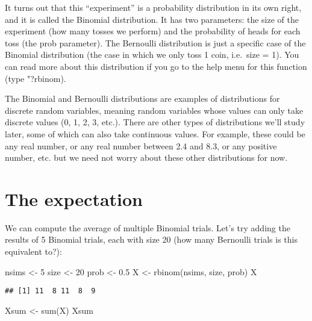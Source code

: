\documentclass[
]{book}
\newenvironment{Shaded}{\begin{snugshade}}{\end{snugshade}}
\newcommand{\DecValTok}[1]{\textcolor[rgb]{0.00,0.00,0.81}{#1}}
\newcommand{\FloatTok}[1]{\textcolor[rgb]{0.00,0.00,0.81}{#1}}
\newcommand{\FunctionTok}[1]{\textcolor[rgb]{0.00,0.00,0.00}{#1}}
\newcommand{\NormalTok}[1]{#1}
\newcommand{\OtherTok}[1]{\textcolor[rgb]{0.56,0.35,0.01}{#1}}
\begin{document}
It turns out that this ``experiment'' is a probability distribution in its own right, and it is called the Binomial distribution. It has two parameters: the size of the experiment (how many tosses we perform) and the probability of heads for each toss (the prob parameter). The Bernoulli distribution is just a specific case of the Binomial distribution (the case in which we only toss 1 coin, i.e.~size = 1). You can read more about this distribution if you go to the help menu for this function (type "?rbinom).

The Binomial and Bernoulli distributions are examples of distributions for discrete random variables, meaning random variables whose values can only take discrete values (0, 1, 2, 3, etc.). There are other types of distributions we'll study later, some of which can also take continuous values. For example, these could be any real number, or any real number between 2.4 and 8.3, or any positive number, etc. but we need not worry about these other distributions for now.

\hypertarget{the-expectation}{%
\section{The expectation}\label{the-expectation}}

We can compute the average of multiple Binomial trials. Let's try adding the results of 5 Binomial trials, each with size 20 (how many Bernoulli trials is this equivalent to?):

\begin{Shaded}
\begin{Highlighting}[]
\NormalTok{nsims }\OtherTok{\textless{}{-}} \DecValTok{5}
\NormalTok{size }\OtherTok{\textless{}{-}} \DecValTok{20}
\NormalTok{prob }\OtherTok{\textless{}{-}} \FloatTok{0.5}
\NormalTok{X }\OtherTok{\textless{}{-}} \FunctionTok{rbinom}\NormalTok{(nsims, size, prob)}
\NormalTok{X}
\end{Highlighting}
\end{Shaded}

\begin{verbatim}
## [1] 11  8 11  8  9
\end{verbatim}

\begin{Shaded}
\begin{Highlighting}[]
\NormalTok{Xsum }\OtherTok{\textless{}{-}} \FunctionTok{sum}\NormalTok{(X)}
\NormalTok{Xsum}
\end{Highlighting}
\end{Shaded}
\end{document}
